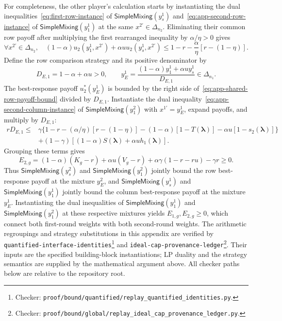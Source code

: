\documentclass[11pt]{article}
\theoremstyle{remark}
\theoremstyle{plain}
\newcommand{\sm}{\mathsf{SimpleMixing}}
\begin{document}
For completeness, the other player's calculation starts by
instantiating the dual inequalities~\eqref{eq:first-row-instance}
of $\sm(y_s^1)$ and~\eqref{eq:app-second-row-instance} of
$\sm(y_1^1)$ at the same $x^{2\prime}\in\Delta_{n_2}$. Eliminating their common
row payoff after multiplying the first rearranged inequality by
$\alpha/\eta>0$ gives
\begin{equation}
 \forall x^{2\prime}\in\Delta_{n_2},\quad
 (1-\alpha)u_2(y_1^1,x^{2\prime})+\alpha u u_2(y_s^1,x^{2\prime})
 \le1-r-\frac{\alpha}{\eta}[r-(1-\eta)].
 \label{eq:app-shared-row-payoff-bound}
\end{equation}
Define the row comparison strategy and its positive denominator by
\begin{equation}
 D_{E,1}=1-\alpha+\alpha u>0,\qquad
 y_E^1=\frac{(1-\alpha)y_1^1+\alpha u y_s^1}{D_{E,1}}\in\Delta_{n_1}.
 \label{eq:app-row-comparison-mixture}
\end{equation}
The best-response payoff $u_2^*(y_E^1)$ is bounded by the right side
of~\eqref{eq:app-shared-row-payoff-bound} divided by $D_{E,1}$.
Instantiate the dual inequality~\eqref{eq:app-second-column-instance}
of $\sm(y_1^2)$ with $x^{1\prime}=y_E^1$, expand payoffs, and
multiply by $D_{E,1}$:
\begin{equation}
 \begin{aligned}
 rD_{E,1}\le{}&
 \gamma\{1-r-(\alpha/\eta)[r-(1-\eta)]
       -(1-\alpha)[1-T(\boldsymbol\lambda)]-\alpha u[1-s_2(\boldsymbol\lambda)]\}\\
 &+(1-\gamma)[(1-\alpha)S(\boldsymbol\lambda)+\alpha u h_1(\boldsymbol\lambda)].
 \end{aligned}
 \label{eq:app-row-mixture-second-column-test}
\end{equation}
Grouping these terms gives
\begin{equation}
 E_{2,g}=(1-\alpha)(K_g-r)+\alpha u(V_g-r)
               +\alpha\gamma(1-r-ru)-\gamma r\ge0.
 \label{eq:app-second-shared-comparison}
\end{equation}
Thus $\sm(y_s^2)$ and $\sm(y_1^2)$ jointly bound the row
best-response payoff at the mixture $y_E^2$, and $\sm(y_s^1)$
and $\sm(y_1^1)$ jointly bound the column best-response payoff
at the mixture $y_E^1$. Instantiating the dual inequalities of
$\sm(y_1^1)$ and $\sm(y_1^2)$ at these respective mixtures yields
$E_{1,g},E_{2,g}\ge0$, which connect both first-round weights with
both second-round weights. The arithmetic regroupings and strategy
substitutions in this appendix are verified by
\nolinkurl{quantified-interface-identities}\footnote{Checker:
\nolinkurl{proof/bound/quantified/replay_quantified_identities.py}.\label{fn:checker-quantified-interface-identities}} and
\nolinkurl{ideal-cap-provenance-ledger}\footnote{Checker:
\nolinkurl{proof/bound/global/replay_ideal_cap_provenance_ledger.py}.\label{fn:checker-ideal-cap-provenance-ledger}}. Their inputs are the specified
building-block instantiations; LP duality and the strategy semantics
are supplied by the mathematical argument above. All checker paths
below are relative to the repository root.
\end{document}
